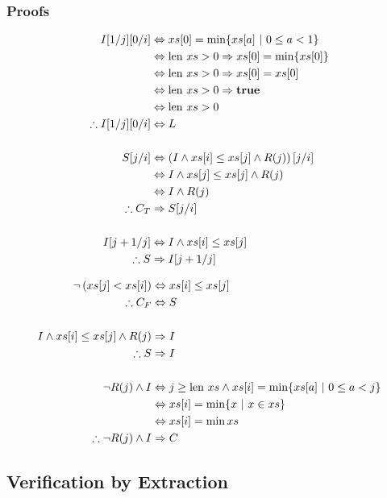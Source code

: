 \begin{lscape}
\begin{multicols}{3}
\subsubsection{Proofs}
\begin{align*}
  I[1/j][0/i] &\iff xs[0] = \min \{xs[a]~|~0 \leq a < 1\}\\
  &\iff \len xs > 0 \implies xs[0] = \min \{xs[0]\}\\
  &\iff \len xs > 0 \implies xs[0] = xs[0]\\
  &\iff \len xs > 0 \implies \true\\
  &\iff \len xs > 0\\
  \therefore I[1/j][0/i] &\iff L\\\\
%
  S[j/i] &\iff \left(I \land xs[i] \leq xs[j] \land R(j)\right)[j/i]\\
  &\iff I \land xs[j] \leq xs[j] \land R(j)\\
  &\iff I \land R(j)\\
  \therefore C_{T} &\implies S[j/i]\\\\
%
  I[j+1/j] &\iff I \land xs[i] \leq xs[j]\\
  \therefore S &\implies I[j+1/j]
\end{align*}

\begin{align*}
  \lnot\left(xs[j] < xs[i]\right) &\iff xs[i] \leq xs[j]\\
  \therefore C_{F} &\iff S\\\\
%
  I \land xs[i] \leq xs[j] \land R(j) &\implies I\\
  \therefore S &\implies I\\\\
%
  \lnot R(j) \land I &\iff j \geq \len xs \land xs[i] = \min
  \{xs[a]~|~0 \leq a < j\}\\
  &\iff xs[i] = \min \{x~|~x \in xs\}\\
  &\iff xs[i] = \min xs\\
  \therefore \lnot R(j) \land I &\implies C
\end{align*}
\vfill
\end{multicols}

\end{lscape}

\subsection{Verification by Extraction}

